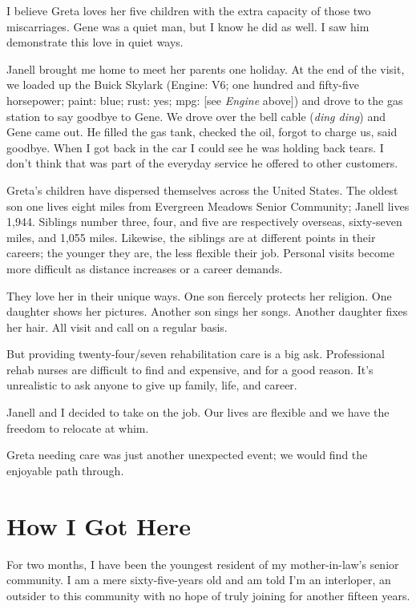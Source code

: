 \documentclass[
  letterpaper,
  DIV=11,
  numbers=noendperiod]{scrreprt}
\begin{document}
I believe Greta loves her five children with the extra capacity of those
two miscarriages. Gene was a quiet man, but I know he did as well. I saw
him demonstrate this love in quiet ways.

Janell brought me home to meet her parents one holiday. At the end of
the visit, we loaded up the Buick Skylark (Engine: V6; one hundred and
fifty-five horsepower; paint: blue; rust: yes; mpg: {[}see \emph{Engine}
above{]}) and drove to the gas station to say goodbye to Gene. We drove
over the bell cable (\emph{ding ding}) and Gene came out. He filled the
gas tank, checked the oil, forgot to charge us, said goodbye. When I got
back in the car I could see he was holding back tears. I don't think
that was part of the everyday service he offered to other customers.

Greta's children have dispersed themselves across the United States. The
oldest son one lives eight miles from Evergreen Meadows Senior
Community; Janell lives 1,944. Siblings number three, four, and five are
respectively overseas, sixty-seven miles, and 1,055 miles. Likewise, the
siblings are at different points in their careers; the younger they are,
the less flexible their job. Personal visits become more difficult as
distance increases or a career demands.

They love her in their unique ways. One son fiercely protects her
religion. One daughter shows her pictures. Another son sings her songs.
Another daughter fixes her hair. All visit and call on a regular basis.

But providing twenty-four/seven rehabilitation care is a big ask.
Professional rehab nurses are difficult to find and expensive, and for a
good reason. It's unrealistic to ask anyone to give up family, life, and
career.

Janell and I decided to take on the job. Our lives are flexible and we
have the freedom to relocate at whim.

Greta needing care was just another unexpected event; we would find the
enjoyable path through.


\chapter*{How I Got Here}\label{how-i-got-here}


For two months, I have been the youngest resident of my mother-in-law's
senior community. I am a mere sixty-five-years old and am told I'm an
interloper, an outsider to this community with no hope of truly joining
for another fifteen years.
\end{document}
